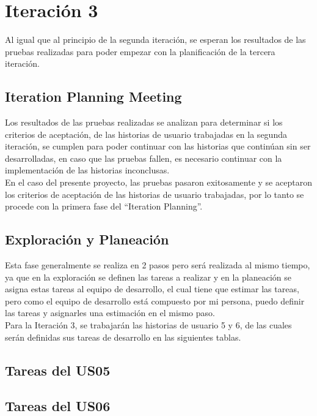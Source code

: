 \section{Iteración 3}
\label{sec:iteracion_3}

Al igual que al principio de la segunda iteración, se esperan los resultados de las pruebas realizadas para poder empezar con la planificación de la tercera iteración.

\subsection{Iteration Planning Meeting}
\label{sub:iteration2_planning_meeting}


Los resultados de las pruebas realizadas se analizan para determinar si los criterios de aceptación, de las historias de usuario trabajadas en la segunda iteración, se cumplen para poder continuar con las historias que continúan sin ser desarrolladas, en caso que las pruebas fallen, es necesario continuar con la implementación de las historias inconclusas.\\

En el caso del presente proyecto, las pruebas pasaron exitosamente y se aceptaron los criterios de aceptación de las historias de usuario trabajadas, por lo tanto se procede con la primera fase del “Iteration Planning”. \\


\subsection{Exploración y Planeación}
\label{sub:iteration2_exploracion_planeacion}

Esta fase generalmente se realiza en 2 pasos pero será realizada al mismo tiempo, ya que en la exploración se definen las tareas a realizar y en la planeación se asigna estas tareas al equipo de desarrollo, el cual tiene que estimar las tareas, pero como el equipo de desarrollo está compuesto por mi persona, puedo definir las tareas y asignarles una estimación en el mismo paso.\\

Para la Iteración 3, se trabajarán las historias de usuario 5 y 6, de las cuales serán definidas sus tareas de desarrollo en las siguientes tablas.


\subsection{Tareas del US05}
\label{sub:us05_tasks}

  

\subsection{Tareas del US06}
\label{sub:us06_tasks}

  
